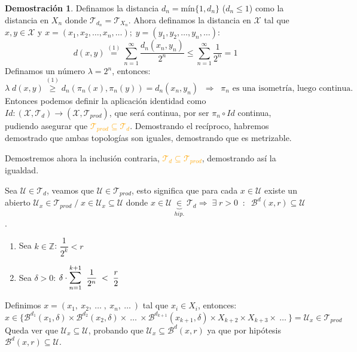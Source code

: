 \documentclass[12pt,twoside]{report}
\newcommand\mc[1]{\mathcal{#1}}
\theoremstyle{azul}
\theoremstyle{azul2}
\theoremstyle{plain}
\theoremstyle{definition}
\newtheorem*{dem}{Demostración}
\theoremstyle{remark}
\begin{document}
\begin{dem}
Definamos la distancia $d_n= \text{mín}\{ 1,d_n \}$ ($d_n\leq 1$) como la distancia en $X_n$ donde $\mc{T}_{d_n}=\mc{T}_{X_n}$. Ahora definamos la distancia en $\mc{X}$ tal que $x,y \in \mc{X} $ y $x=(x_1, x_2, \ldots, x_n , \ldots); \; y=(y_1, y_2, \ldots, y_n , \ldots)$:
$$d(x,y)\stackrel{(1)}{=}\sum_{n=1}^{\infty} \dfrac{d_n (x_n, y_n)}{2^n} \leq \sum_{n=1}^{\infty} \dfrac{1}{2^n} = 1$$
Definamos un n{\'u}mero $\lambda = 2^n$, entonces:
$$\lambda \; d(x,y) \stackrel{(1)}{\geq}  d_n(\pi_n(x), \pi_n(y)) =d_n(x_n,y_n) \; \; \Rightarrow \; \;  \pi_n \text{ es una isometría, luego continua.}$$
Entonces podemos definir la aplicación identidad como $Id: (\mc{X}, \mc{T}_d) \longrightarrow(\mc{X}, \mc{T}_{prod})$, que será continua, por ser $\pi_n \circ Id$ continua, pudiendo asegurar que \textcolor{orange}{$\mc{T}_{prod} \subseteq \mc{T}_{d}$}. Demostrando el recíproco, habremos demostrado que ambas topologías son iguales, demostrando que es metrizable.

Demostremos ahora la inclusión contraria, \textcolor{orange}{$\mc{T}_d \subseteq \mc{T}_{prod}$}, demostrando así la igualdad.

Sea $\mc{U} \in \mc{T}_d$, veamos que $\mc{U} \in \mc{T}_{prod}$, esto significa que para cada $x \in \mc{U}$ existe un abierto $\mc{U}_x \in \mc{T}_{prod} \; / \; x \in \mc{U}_x \subseteq \mc{U}$ donde $x \in \mc{U} \underbrace{\in}_{hip.} \mc{T}_{d} \Rightarrow \; \exists \; r>0 \; \; : \; \; \mc{B}^d(x,r) \subseteq \mc{U} $.
\begin{enumerate}
    \item Sea $k \in \mathbb{Z}$: \; \; $\dfrac{1}{2^k} < r$ \vspace{5mm}
    \item Sea $\delta > 0$: \; \; $\delta \cdot \underset{n=1}{\overset{k+1}{\mathlarger{\mathlarger{\sum}}}} \; \; \dfrac{1}{2^n} \;  < \;  \dfrac{r}{2}$
\end{enumerate}
Definimos $x=(x_1, \: x_2, \: \ldots \; , \: x_n ,\: \ldots \: )$ tal que $x_i \in X_i$, entonces: 
$$x \in \Big\{ \mc{B}^{d_1}(x_1, \delta) \times \mc{B}^{d_2}(x_2, \delta) \times \: \ldots \: \times \mc{B}^{d_{k+1}}(x_{k+1}, \delta) \times X_{k+2} \times X_{k+3} \times \: \ldots \:\Big\}=\mc{U}_x \in \mc{T}_{prod}$$
Queda ver que $\mc{U}_x \subseteq \mc{U}$, probando que $\mc{U}_x \subseteq \mc{B}^d(x,r)$ ya que por hipótesis $\mc{B}^d(x,r) \subseteq \mc{U}$.


\end{dem}
\end{document}
